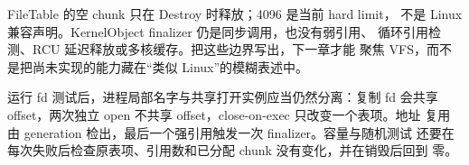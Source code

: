 FileTable 的空 chunk 只在 Destroy 时释放；4096 是当前 hard limit，
不是 Linux 兼容声明。KernelObject finalizer 仍是同步调用，也没有弱引用、
循环引用检测、RCU 延迟释放或多核缓存。把这些边界写出，下一章才能
聚焦 VFS，而不是把尚未实现的能力藏在“类似 Linux”的模糊表述中。

运行 fd 测试后，进程局部名字与共享打开实例应当仍然分离：复制 fd 会共享
offset，两次独立 open 不共享 offset，close-on-exec 只改变一个表项。地址
复用由 generation 检出，最后一个强引用触发一次 finalizer。容量与随机测试
还要在每次失败后检查原表项、引用数和已分配 chunk 没有变化，并在销毁后回到
零。
